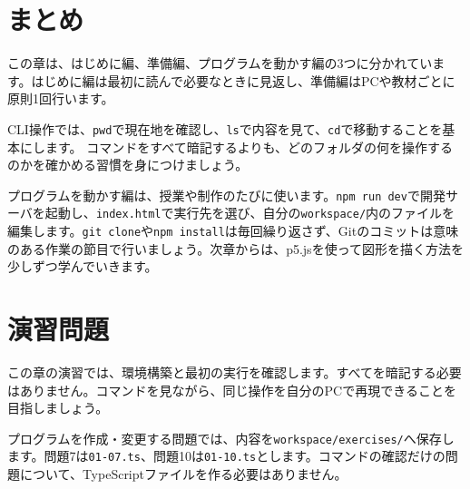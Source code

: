 \section{まとめ}

この章は、はじめに編、準備編、プログラムを動かす編の3つに分かれています。はじめに編は最初に読んで必要なときに見返し、準備編はPCや教材ごとに原則1回行います。

CLI操作では、\texttt{pwd}で現在地を確認し、\texttt{ls}で内容を見て、\texttt{cd}で移動することを基本にします。
コマンドをすべて暗記するよりも、どのフォルダの何を操作するのかを確かめる習慣を身につけましょう。

プログラムを動かす編は、授業や制作のたびに使います。\texttt{npm run dev}で開発サーバを起動し、\texttt{index.html}で実行先を選び、自分の\texttt{workspace/}内のファイルを編集します。\texttt{git clone}や\texttt{npm install}は毎回繰り返さず、Gitのコミットは意味のある作業の節目で行いましょう。次章からは、p5.jsを使って図形を描く方法を少しずつ学んでいきます。

\section{演習問題}

この章の演習では、環境構築と最初の実行を確認します。すべてを暗記する必要はありません。コマンドを見ながら、同じ操作を自分のPCで再現できることを目指しましょう。

プログラムを作成・変更する問題では、内容を\texttt{workspace/exercises/}へ保存します。問題7は\texttt{01-07.ts}、問題10は\texttt{01-10.ts}とします。コマンドの確認だけの問題について、TypeScriptファイルを作る必要はありません。

